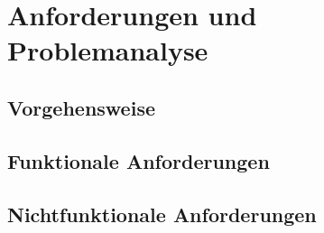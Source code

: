 \chapter{Anforderungen und Problemanalyse}
\label{ch:anforderungen}


\section{Vorgehensweise}
\section{Funktionale Anforderungen}
\section{Nichtfunktionale Anforderungen}
